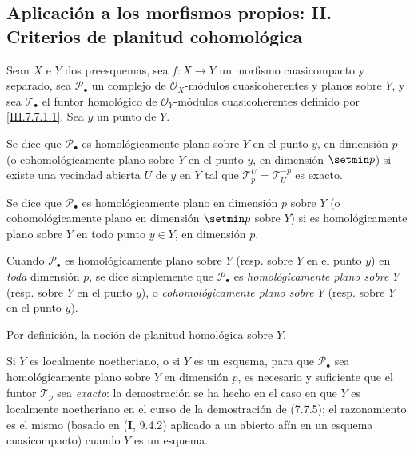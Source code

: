 \subsection{Aplicación a los morfismos propios: II. Criterios de planitud cohomológica}
\label{subsection:III.7.8}
\label{subsection:III.7.8.fr}
\label{III.7.8}

\begin{definition}[7.8.1]
\label{III.7.8.1}
Sean $X$ e $Y$ dos preesquemas, sea $f:X\to Y$ un morfismo
cuasicompacto y separado, sea $\mathscr P_\bullet$ un complejo de
$\mathscr O_X$-módulos cuasicoherentes y planos sobre $Y$, y sea
$\mathscr T_\bullet$ el funtor homológico de $\mathscr O_Y$-módulos
cuasicoherentes definido por \eqref{III.7.7.1.1}. Sea $y$ un punto
de $Y$.

Se dice que $\mathscr P_\bullet$ es
homológicamente plano sobre
$Y$ en el punto $y$, en dimensión $p$ \textup{(o} cohomológicamente
plano sobre $Y$ en el punto $y$, en dimensión $\setmin p$) si existe una
vecindad abierta $U$ de $y$ en $Y$ tal que
$\mathscr T_p^U=\mathscr T_U^{-p}$
es exacto.

Se dice que $\mathscr P_\bullet$ es homológicamente plano en
dimensión $p$ sobre $Y$ \textup{(o} cohomológicamente plano en
dimensión $\setmin p$ sobre $Y$) si es homológicamente plano sobre $Y$ en
todo punto $y\in Y$, en dimensión $p$.

\upshape Cuando $\mathscr P_\bullet$ es homológicamente plano sobre $Y$
(resp. sobre $Y$ en el punto $y$) en \emph{toda}
dimensión $p$, se dice simplemente que $\mathscr P_\bullet$ es
\emph{homológicamente plano sobre $Y$} (resp. sobre $Y$
en el punto $y$), o \emph{cohomológicamente plano sobre $Y$}
(resp. sobre $Y$ en el punto $y$).
\end{definition}

\begin{env}[7.8.2]
Por definición, la noción de planitud homológica sobre $Y$.

Si $Y$ es localmente noetheriano, o si $Y$ es un esquema, para que
$\mathscr P_\bullet$ sea homológicamente plano sobre $Y$ en
dimensión $p$, es necesario y suficiente que el funtor
$\mathscr T_p$ sea \emph{exacto}: la demostración se ha hecho en el caso en que $Y$ es localmente noetheriano en el curso de la demostración de (7.7.5); el razonamiento es el mismo (basado en (\textbf{I}, 9.4.2) aplicado a un abierto afín en un esquema cuasicompacto) cuando $Y$ es un esquema.
\end{env}

